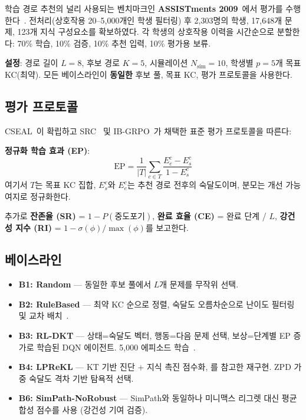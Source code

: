 \documentclass[runningheads]{llncs}
\begin{document}
학습 경로 추천의 널리 사용되는 벤치마크인 \textbf{ASSISTments 2009}~\cite{assistments}에서 평가를 수행한다~\cite{src2023,cseal2019,ibgrpo2026}.
전처리(상호작용 20--5,000개인 학생 필터링) 후 2,303명의 학생, 17,648개 문제, 123개 지식 구성요소를 확보하였다.
각 학생의 상호작용 이력을 시간순으로 분할한다: 70\% 학습, 10\% 검증, 10\% 추천 입력, 10\% 평가용 보류.

\textbf{설정}: 경로 길이 $L=8$, 후보 경로 $K=5$, 시뮬레이션 $N_{\text{sim}}=10$, 학생별 $p=5$개 목표 KC(최약). 모든 베이스라인이 \textbf{동일한} 후보 풀, 목표 KC, 평가 프로토콜을 사용한다.

\subsection{평가 프로토콜}

CSEAL~\cite{cseal2019}이 확립하고 SRC~\cite{src2023} 및 IB-GRPO~\cite{ibgrpo2026}가 채택한 표준 평가 프로토콜을 따른다:

\textbf{정규화 학습 효과 (EP)}:
\begin{equation}
\text{EP} = \frac{1}{|T|} \sum_{c \in T} \frac{E_e^c - E_s^c}{1 - E_s^c}
\end{equation}
여기서 $T$는 목표 KC 집합, $E_s^c$와 $E_e^c$는 추천 경로 전후의 숙달도이며, 분모는 개선 가능 여지로 정규화한다.

추가로 \textbf{잔존율 (SR)} = $1 - P(\text{중도포기})$, \textbf{완료 효율 (CE)} = 완료 단계 / $L$, \textbf{강건성 지수 (RI)} = $1 - \sigma(\phi) / \max(\phi)$를 보고한다.

\subsection{베이스라인}

\begin{itemize}
\item \textbf{B1: Random} --- 동일한 후보 풀에서 $L$개 문제를 무작위 선택.
\item \textbf{B2: RuleBased} --- 최약 KC 순으로 정렬, 숙달도 오름차순으로 난이도 필터링 및 교차 배치~\cite{src2023}.
\item \textbf{B3: RL-DKT} --- 상태=숙달도 벡터, 행동=다음 문제 선택, 보상=단계별 EP 증가로 학습된 DQN 에이전트. 5,000 에피소드 학습~\cite{cseal2019}.
\item \textbf{B4: LPReKL} --- KT 기반 진단 + 지식 촉진 점수화, \cite{lprekl2025}를 참고한 재구현. ZPD 가중 숙달도 격차 기반 탐욕적 선택.
\item \textbf{B6: SimPath-NoRobust} --- SimPath와 동일하나 미니맥스 리그렛 대신 평균 합성 점수를 사용 (강건성 기여 검증).
\end{itemize}
\end{document}
